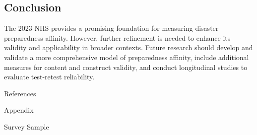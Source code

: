 \documentclass[
  letterpaper,
  DIV=11,
  numbers=noendperiod]{scrartcl}
\begin{document}
\subsection{Conclusion}\label{conclusion}

The 2023 NHS provides a promising foundation for measuring disaster
preparedness affinity. However, further refinement is needed to enhance
its validity and applicability in broader contexts. Future research
should develop and validate a more comprehensive model of preparedness
affinity, include additional measures for content and construct
validity, and conduct longitudinal studies to evaluate test-retest
reliability.

References

Appendix

\begin{table}

\caption{\label{tbl-sample}Survey Sample}

\centering{

}
\end{table}
\end{document}
